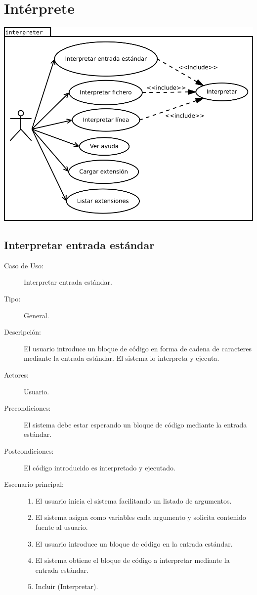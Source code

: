 \section{Intérprete}
\begin{center}
\includegraphics[scale=0.5]{interpreter.png} \\
\end{center}
\subsection{Interpretar entrada estándar}
\begin{framed}
\begin{description}
  \item[Caso de Uso:] 
  Interpretar entrada estándar.
  \item[Tipo:] General.
  \item[Descripción:] 
  El usuario introduce un bloque de código en forma de cadena de 
  caracteres mediante la entrada estándar. El sistema lo interpreta 
  y ejecuta.
  \item[Actores:] 
  Usuario.
  \item[Precondiciones:] 
  El sistema debe estar esperando un bloque de código mediante la entrada estándar.
  \item[Postcondiciones:] 
  El código introducido es interpretado y ejecutado.
  \item[Escenario principal:] \hfill 
  \begin{enumerate}
   \item El usuario inicia el sistema facilitando un listado de argumentos.
   \item El sistema asigna como variables cada argumento y solicita contenido fuente al usuario. 
   \item El usuario introduce un bloque de código en la entrada estándar.
   \item El sistema obtiene el bloque de código a interpretar mediante la entrada estándar.
   \item Incluir (Interpretar). 
  \end{enumerate}
\end{description}
\end{framed}
